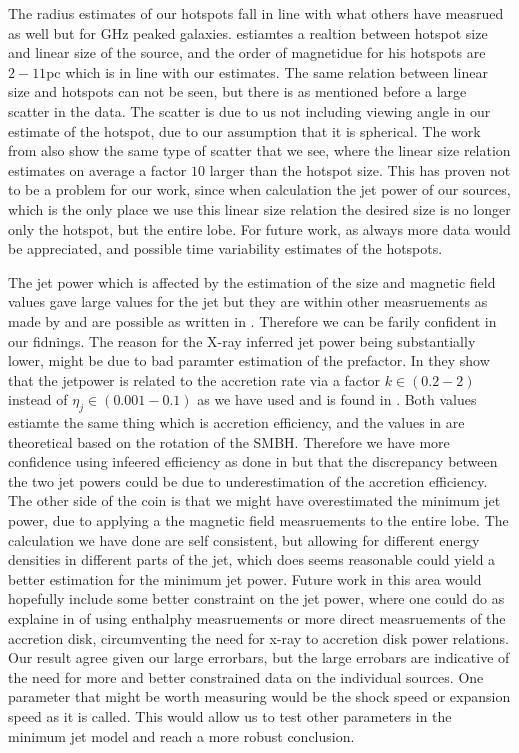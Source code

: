 The radius estimates of our hotspots fall in line with what others have measrued as well but for GHz peaked galaxies. \cite{Perucho_2002} estiamtes a realtion between hotspot size and linear size of the source, and the order of magnetidue for his hotspots are $2-11$pc which is in line with our estimates. The same relation between linear size and hotspots can not be seen, but there is as mentioned before a large scatter in the data. The scatter is due to us not including viewing angle in our estimate of the hotspot, due to our assumption that it is spherical. The work from \cite{Perucho_2002} also show the same type of scatter that we see, where the linear size relation estimates on average a factor $10$ larger than the hotspot size. This has proven not to be a problem for our work, since when calculation the jet power of our sources, which is the only place we use this linear size relation the desired size is no longer only the hotspot, but the entire lobe. For future work, as always more data would be appreciated, and possible time variability estimates of the hotspots. 


The jet power which is affected by the estimation of the size and magnetic field values gave large values for the jet but they are within other measruements as made by \cite{W_jtowicz_2020} and are possible as written in \cite{readhead2023compact}. Therefore we can be farily confident in our fidnings. The reason for the X-ray inferred jet power being substantially lower, might be due to bad paramter estimation of the prefactor. In \cite{readhead2023compact} they show that the jetpower is related to the accretion rate via a factor $k \in (0.2-2)$ instead of $\eta_j \in (0.001-0.1)$ as we have used and is found in \cite{W_jtowicz_2020}. Both values estiamte the same thing which is accretion efficiency, and the values in \cite{readhead2023compact} are theoretical based on the rotation of the SMBH. Therefore we have more confidence using infeered efficiency as done in \cite{W_jtowicz_2020} but that the discrepancy between the two jet powers could be due to underestimation of the accretion efficiency. The other side of the coin is that we might have overestimated the minimum jet power, due to applying a the magnetic field measruements to the entire lobe. The calculation we have done are self consistent, but allowing for different energy densities in different parts of the jet, which does seems reasonable could yield a better estimation for the minimum jet power. Future work in this area would hopefully include some better constraint on the jet power, where one could do as explaine in \cite{Wykes_2013} of using enthalphy measruements or more direct measruements of the accretion disk, circumventing the need for x-ray to accretion disk power relations. Our result agree given our large errorbars, but the large errobars are indicative of the need for more and better constrained data on the individual sources. One parameter that might be worth measuring would be the shock speed or expansion speed as it is called. This would allow us to test other parameters in the minimum jet model and reach a more robust conclusion. 

